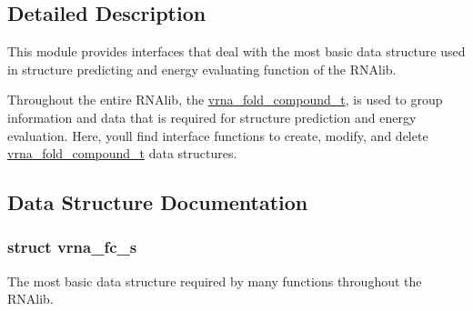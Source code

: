 

\subsection{Detailed Description}
This module provides interfaces that deal with the most basic data structure used in structure predicting and energy evaluating function of the R\+N\+Alib. 

Throughout the entire R\+N\+Alib, the \hyperlink{group__fold__compound_ga1b0cef17fd40466cef5968eaeeff6166}{vrna\+\_\+fold\+\_\+compound\+\_\+t}, is used to group information and data that is required for structure prediction and energy evaluation. Here, you\textquotesingle{}ll find interface functions to create, modify, and delete \hyperlink{group__fold__compound_ga1b0cef17fd40466cef5968eaeeff6166}{vrna\+\_\+fold\+\_\+compound\+\_\+t} data structures. 

\subsection{Data Structure Documentation}
\label{structvrna__fc__s}
\subsubsection{struct vrna\+\_\+fc\+\_\+s}
The most basic data structure required by many functions throughout the R\+N\+Alib. 

